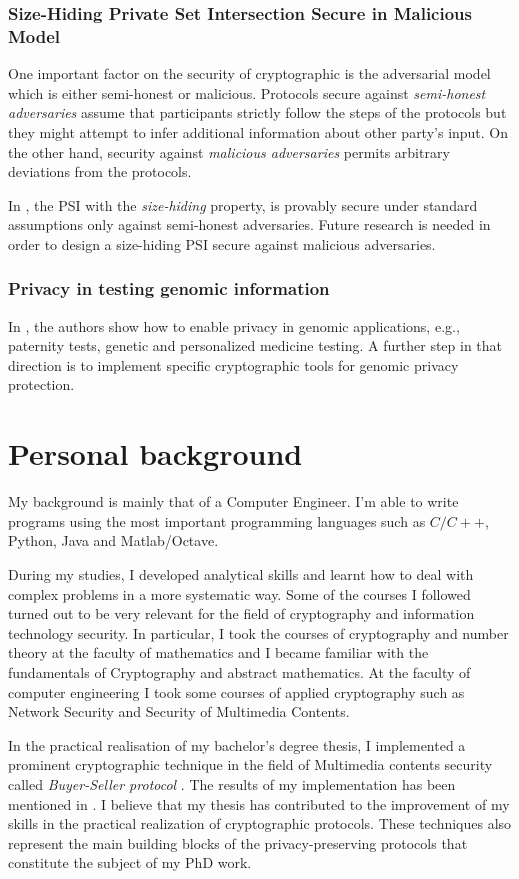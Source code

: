 \documentclass[dvips,12pt]{article}
\begin{document}
\subsubsection{Size-Hiding Private Set Intersection Secure in Malicious Model}
One important factor on the security of cryptographic is the adversarial model which is either semi-honest or malicious. Protocols secure against \emph{semi-honest adversaries} assume that participants strictly follow the steps of the protocols but they might attempt to infer additional information about other party's input. On the other hand, security against \emph{malicious adversaries} permits arbitrary deviations from the protocols.

In \cite{size-psi}, the PSI with the \emph{size-hiding} property, is provably secure under standard assumptions only against semi-honest adversaries. Future research is needed in order to design a size-hiding PSI secure against malicious adversaries.  
\subsubsection{Privacy in testing genomic information}
In \cite{genome}, the authors show how to enable privacy in genomic applications, e.g., paternity tests, genetic and personalized medicine testing. A further step in that direction is to implement specific cryptographic tools for genomic privacy protection.

\section{Personal background}
My background is mainly that of a Computer Engineer.
I'm able to write programs using the most important programming languages such as $C / C++$, Python, Java and Matlab/Octave.

During my studies, I developed analytical skills and learnt how to deal with complex problems in a more systematic way. Some of the courses I followed turned out to be very relevant for the field of cryptography and information technology security. 
In particular, I took the courses of cryptography and number theory at the faculty of mathematics and I became familiar with the fundamentals of Cryptography and abstract mathematics.
At the faculty of computer engineering I took some courses of applied cryptography such as Network Security and Security of Multimedia Contents.

In the practical realisation of my bachelor's degree thesis, I implemented a prominent cryptographic technique in the field of Multimedia contents security called \emph{Buyer-Seller protocol} \cite{tesi}. 
The results of my implementation has been mentioned in \cite{tesi2}.
I believe that my thesis has contributed to the improvement of my skills in the practical realization of  cryptographic protocols. These techniques also represent the main building blocks of the privacy-preserving protocols that constitute the subject of my PhD work.
\end{document}
